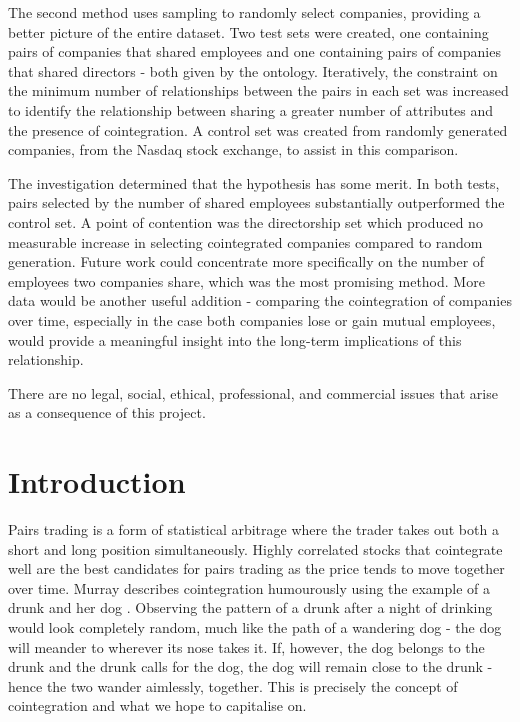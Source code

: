 \documentclass{UoYCSproject}
\begin{document}
\begin{summary}
The second method uses sampling to randomly select companies, providing a better picture of the entire dataset. Two test sets were created, one containing pairs of companies that shared employees and one containing pairs of companies that shared directors - both given by the ontology. Iteratively, the constraint on the minimum number of relationships between the pairs in each set was increased to identify the relationship between sharing a greater number of attributes and the presence of cointegration. A control set was created from randomly generated companies, from the Nasdaq stock exchange, to assist in this comparison.

The investigation determined that the hypothesis has some merit. In both tests, pairs selected by the number of shared employees substantially outperformed the control set. A point of contention was the directorship set which produced no measurable increase in selecting cointegrated companies compared to random generation. Future work could concentrate more specifically on the number of employees two companies share, which was the most promising method. More data would be another useful addition - comparing the cointegration of companies over time, especially in the case both companies lose or gain mutual employees, would provide a meaningful insight into the long-term implications of this relationship.

There are no legal, social, ethical, professional, and commercial issues that arise as a consequence of this project.
\end{summary}

\chapter{Introduction}
\label{cha:Introduction}

Pairs trading is a form of statistical arbitrage where the trader takes out both a short and long position simultaneously. Highly correlated stocks that cointegrate well are the best candidates for pairs trading as the price tends to move together over time. Murray describes cointegration humourously using the example of a drunk and her dog \parencite{drunkdog}. Observing the pattern of a drunk after a night of drinking would look completely random, much like the path of a wandering dog - the dog will meander to wherever its nose takes it. If, however, the dog belongs to the drunk and the drunk calls for the dog, the dog will remain close to the drunk - hence the two wander aimlessly, together. This is precisely the concept of cointegration and what we hope to capitalise on.
\end{document}
